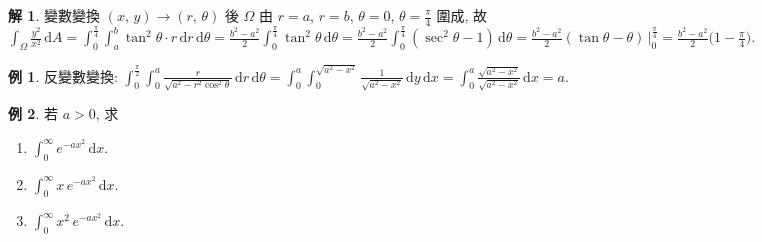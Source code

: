 \documentclass[12pt]{extarticle}
\newcommand{\ds}{\displaystyle}
\theoremstyle{definition}
\newtheorem*{ex}{例}
\newtheorem*{sol}{解}
\begin{document}
\begin{sol}
  變數變換 $(x,\,y)\to(r,\,\theta)$ 後 $\Omega$ 由 $r = a$, $r = b$, $\theta = 0$, $\ds\theta = \frac{\pi}{4}$ 圍成, 故 $\ds\int_\Omega\frac{y^2}{x^2}\,\text{d}A = \int_0^{\frac{\pi}{4}}\!\int_a^b\!\tan^2\theta\cdot r\,\text{d}r\,\text{d}\theta = \frac{b^2 - a^2}{2}\int_0^{\frac{\pi}{4}}\tan^2\theta\,\text{d}\theta = \frac{b^2 - a^2}{2}\int_0^{\frac{\pi}{4}}(\sec^2\theta - 1)\,\text{d}\theta = \frac{b^2 - a^2}{2}(\tan\theta - \theta)\,\Big|_{0}^{\frac{\pi}{4}} = \frac{b^2 - a^2}{2}\Big(1 - \frac{\pi}{4}\Big)$.
\end{sol}

\begin{ex}
  反變數變換: $\ds\int_0^{\frac{\pi}{2}}\!\!\int_0^a\!\frac{r}{\sqrt{a^2 - r^2\cos^2\theta}}\,\text{d}r\,\text{d}\theta = \int_0^a\!\!\int_0^{\sqrt{a^2 - x^2}}\!\!\frac{1}{\sqrt{a^2 - x^2}}\,\text{d}y\,\text{d}x = \int_0^a\frac{\sqrt{a^2 - x^2}}{\sqrt{a^2 - x^2}}\,\text{d}x = a$.  
\end{ex}

\begin{ex} 若 $a > 0$, 求
  \begin{multicols}{3}
    \begin{enumerate}
      \item $\ds\int_0^\infty\!e^{-ax^2}\,\text{d}x$. 
      \item $\ds\int_0^\infty x\,e^{-ax^2}\,\text{d}x$.
      \item $\ds\int_0^\infty x^2\,e^{-ax^2}\,\text{d}x$.
    \end{enumerate}
  \end{multicols}
\end{ex}
\end{document}

